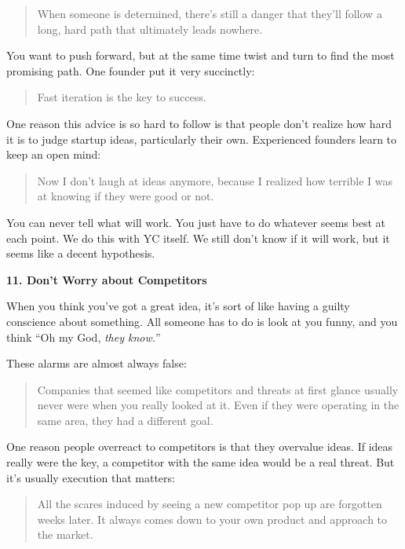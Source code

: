 \documentclass[12pt]{book}
\begin{document}
\begin{quote}
When someone is determined, there's still a danger that they'll follow a
long, hard path that ultimately leads nowhere.
\end{quote}

You want to push forward, but at the same time twist and turn to find
the most promising path. One founder put it very succinctly:

\begin{quote}
Fast iteration is the key to success.
\end{quote}

One reason this advice is so hard to follow is that people don't realize
how hard it is to judge startup ideas, particularly their own.
Experienced founders learn to keep an open mind:

\begin{quote}
Now I don't laugh at ideas anymore, because I realized how terrible I
was at knowing if they were good or not.
\end{quote}

You can never tell what will work. You just have to do whatever seems
best at each point. We do this with YC itself. We still don't know if it
will work, but it seems like a decent hypothesis.

\textbf{11. Don't Worry about Competitors}

When you think you've got a great idea, it's sort of like having a
guilty conscience about something. All someone has to do is look at you
funny, and you think ``Oh my God, \emph{they know.}''

These alarms are almost always false:

\begin{quote}
Companies that seemed like competitors and threats at first glance
usually never were when you really looked at it. Even if they were
operating in the same area, they had a different goal.
\end{quote}

One reason people overreact to competitors is that they overvalue ideas.
If ideas really were the key, a competitor with the same idea would be a
real threat. But it's usually execution that matters:

\begin{quote}
All the scares induced by seeing a new competitor pop up are forgotten
weeks later. It always comes down to your own product and approach to
the market.
\end{quote}
\end{document}
